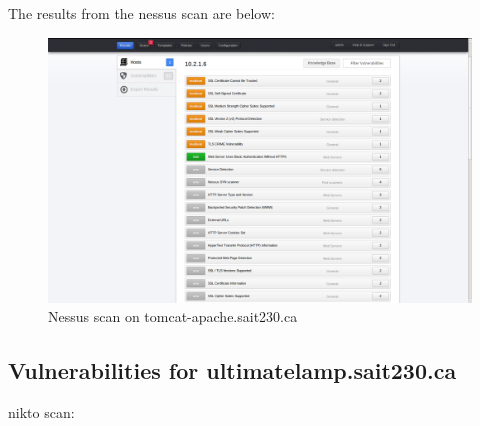 \documentclass{article}
\begin{document}
The results from the nessus scan are below:

\begin{figure}[h!]
	\includegraphics[width=\linewidth]{images/nessus-tomcat.png}
	\caption{Nessus scan on tomcat-apache.sait230.ca}
	\label{fig:nessus-tomcat}
\end{figure}

\subsection{Vulnerabilities for ultimatelamp.sait230.ca}
nikto scan:
\end{document}
